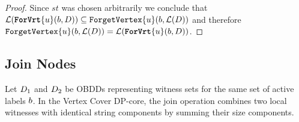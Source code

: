 \begin{proof}
    Since $st$ was chosen arbitrarily we conclude that $\mathcal{L}(\texttt{\textbf{ForVrt}}\{u\}(b,D)) \subseteq \texttt{ForgetVertex}\{u\}(b,\mathcal{L}(D))$ and therefore $\texttt{ForgetVertex}\{u\}(b, \mathcal{L}(D)) = \mathcal{L}(\texttt{\textbf{ForVrt}}\{u\}(b, D))$.
\end{proof}




\subsection{Join Nodes}

Let $D_1$ and $D_2$ be OBDDs representing witness sets for the same set of
active labels $b$. In the {\sc Vertex Cover} DP-core, the join
operation combines two local witnesses with identical string components by
summing their size components.


